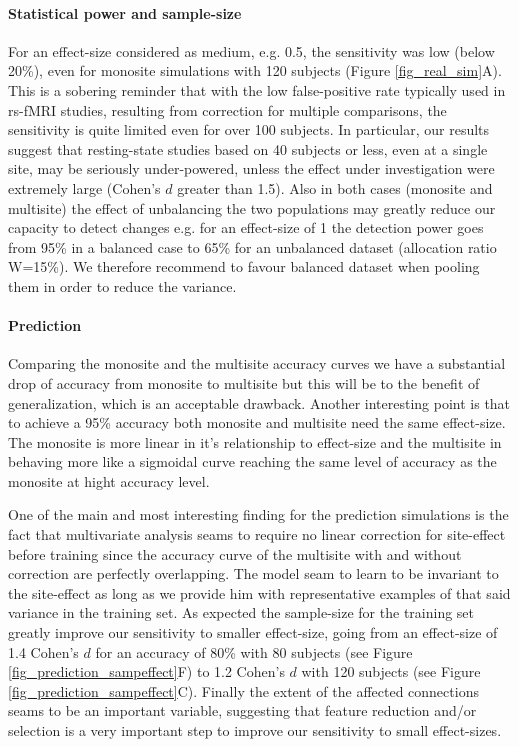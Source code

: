 \documentclass[authoryear]{elsarticle}
\begin{document}
\paragraph{Statistical power and sample-size} For an effect-size considered as medium, e.g. 0.5, the sensitivity was low (below 20\%), even for monosite simulations with 120 subjects (Figure \ref{fig_real_sim}A). This is a sobering reminder that with the low false-positive rate typically used in rs-fMRI studies, resulting from correction for multiple comparisons, the sensitivity is quite limited even for over 100 subjects. In particular, our results suggest that resting-state studies based on 40 subjects or less, even at a single site, may be seriously under-powered, unless the effect under investigation were extremely large (Cohen's $d$ greater than 1.5). Also in both cases (monosite and multisite) the effect of unbalancing the two populations may greatly reduce our capacity to detect changes e.g. for an effect-size of 1 the detection power goes from 95\% in a balanced case to 65\% for an unbalanced dataset (allocation ratio W=15\%). We therefore recommend to favour balanced dataset when pooling them in order to reduce the variance.

\paragraph{Prediction}
Comparing the monosite and the multisite accuracy curves we have a substantial drop of accuracy from monosite to multisite but this will be to the benefit of generalization, which is an acceptable drawback. Another interesting point is that to achieve a 95\% accuracy both monosite and multisite need the same effect-size. The monosite is more linear in it's relationship to effect-size and the multisite in behaving more like a sigmoidal curve reaching the same level of accuracy as the monosite at hight accuracy level.

One of the main and most interesting finding for the prediction simulations is the fact that multivariate analysis seams to require no linear correction for site-effect before training since the accuracy curve of the multisite with and without correction are perfectly overlapping. The model seam to learn to be invariant to the site-effect as long as we provide him with representative examples of that said variance in the training set. As expected the sample-size for the training set greatly improve our sensitivity to smaller effect-size, going from an effect-size of 1.4 Cohen's $d$ for an accuracy of 80\% with 80 subjects (see Figure \ref{fig_prediction_sampeffect}F) to 1.2 Cohen's $d$ with 120 subjects (see Figure \ref{fig_prediction_sampeffect}C). Finally the extent of the affected connections seams to be an important variable, suggesting that feature reduction and/or selection is a very important step to improve our sensitivity to small effect-sizes.
\end{document}
